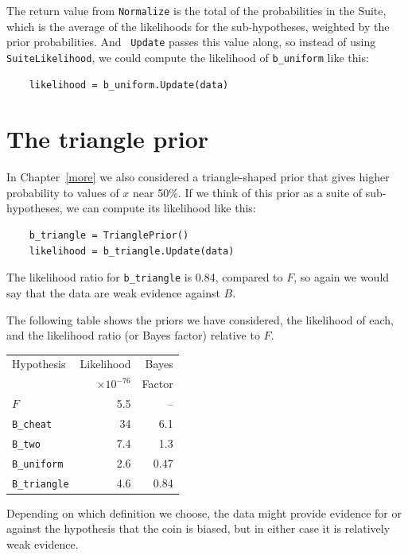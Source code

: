 \documentclass[12pt]{book}
\begin{document}
The return value from {\tt Normalize} is the total of the
probabilities in the Suite, which is the average of the likelihoods
for the sub-hypotheses, weighted by the prior probabilities.  And {\tt
  Update} passes this value along, so instead of using {\tt
  SuiteLikelihood}, we could compute the likelihood of
\verb"b_uniform" like this:

\begin{verbatim}
    likelihood = b_uniform.Update(data)
\end{verbatim}



\section{The triangle prior}

In Chapter~\ref{more} we also considered a triangle-shaped prior that
gives higher probability to values of $x$ near 50\%.  If we think of
this prior as a suite of sub-hypotheses, we can compute its likelihood
like this:

\begin{verbatim}
    b_triangle = TrianglePrior()
    likelihood = b_triangle.Update(data)
\end{verbatim}

The likelihood ratio for \verb"b_triangle" is 0.84, compared to $F$, so
again we would say that the data are weak evidence against $B$.

The following table shows the priors we have considered, the
likelihood of each, and the likelihood ratio (or Bayes factor)
relative to $F$.

\begin{tabular}{|l|r|r|}
\hline
Hypothesis   & Likelihood & Bayes  \\
             & $\times 10^{-76}$ & Factor  \\
\hline
$F$              & 5.5   & --   \\
\verb"B_cheat"  & 34   &  6.1   \\
\verb"B_two"     & 7.4   &  1.3   \\
\verb"B_uniform"  & 2.6   &  0.47   \\
\verb"B_triangle"  & 4.6   &  0.84   \\
\hline
\end{tabular}

Depending on which definition we choose, the data might provide
evidence for or against the hypothesis that the coin is biased, but
in either case it is relatively weak evidence.
\end{document}
